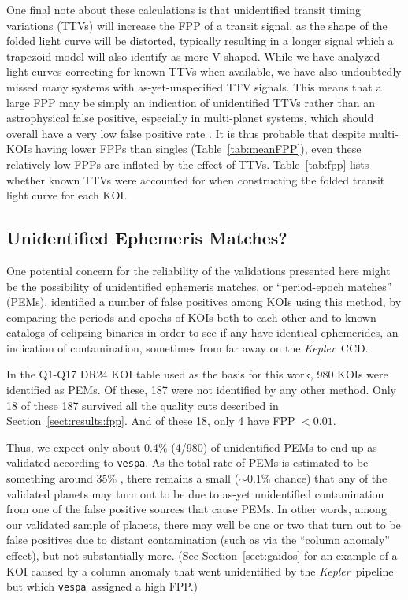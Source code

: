 \documentclass{emulateapj}
\newcommand{\Tab}[1]{Table~\ref{tab:#1}}
\newcommand{\tab}[1]{\Tab{#1}}
\newcommand{\sectionname}{Section}
\newcommand{\Sect}[1]{\sectionname~\ref{sect:#1}}
\newcommand{\sect}[1]{\Sect{#1}}
\newcommand{\sectlabel}[1]{\label{sect:#1}}
\newcommand{\kepler}{\textit{Kepler}}
\newcommand{\vespa}{\texttt{vespa}}
\begin{document}
One final note about these calculations is that unidentified transit
timing variations (TTVs) will increase the FPP of a transit signal, as
the shape of the folded light curve will be distorted, typically
resulting in a longer signal which a trapezoid model will also
identify as more V-shaped.  While we have analyzed light curves
correcting for known TTVs when available, we have also undoubtedly
missed many systems with as-yet-unspecified TTV signals.  This means
that a large FPP may be simply an indication of unidentified TTVs
rather than an astrophysical false positive, especially in  
multi-planet systems, which should overall have a very low false positive
rate \citep{Lissauer:2014,Rowe:2014}.  It is thus probable that
despite multi-KOIs having lower FPPs than singles (\tab{meanFPP}),
even these relatively low FPPs are inflated by the effect of TTVs.
\Tab{fpp} lists whether known TTVs were accounted for when constructing
the folded transit light curve for each KOI.


\subsection{Unidentified Ephemeris Matches?}
\sectlabel{PEMs}

One potential concern for the reliability of the validations presented
here might be the possibility of unidentified ephemeris matches, or
``period-epoch matches'' (PEMs).  \citet{Coughlin:2014} identified a
number of false positives among KOIs using this method, by comparing
the periods and epochs of KOIs both to each other and to known
catalogs of eclipsing binaries in order to see if any have identical
ephemerides, an indication of contamination, sometimes from far away 
on the \kepler\ CCD.  

In the Q1-Q17 DR24 KOI table used as the basis for this work, 980
KOIs were identified as PEMs.  Of these, 187 were not identified by
any other method.  Only 18 of these 187 survived all the quality cuts
described in \sect{results:fpp}. And of these 18, only 4 have FPP 
$< 0.01$.

Thus, we expect only about 0.4\% (4/980) of unidentified PEMs to end
up as validated according to \vespa. As the total rate of PEMs is
estimated to be something around 35\% \citep{Coughlin:2014}, there
remains a small ($\sim$0.1\%  chance) that any of the validated
planets may turn out to be due to  as-yet unidentified contamination
from one of the false positive  sources that cause PEMs.  In other
words, among our validated sample of planets, there may well be one or
two that turn out to be false positives due to distant contamination
(such as via the ``column anomaly'' effect), but not substantially
more.  (See \sect{gaidos} for an example of a KOI caused by a 
column anomaly that went unidentified by the \kepler\ pipeline but
which \vespa\ assigned a high FPP.)
\end{document}
